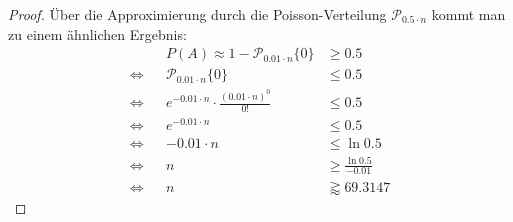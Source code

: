 \documentclass[a4paper]{scrartcl}
\newcommand{\gdw}{\Leftrightarrow}
\begin{document}
\begin{enumerate}[label=\bfseries\arabic*.]
\begin{enumerate}
\begin{proof}
                    Über die Approximierung durch die Poisson-Verteilung
                    $\mathcal{P}_{\num{0,5} \cdot n}$ kommt man zu einem
                    ähnlichen Ergebnis:
                    \begin{equation*}
                        \begin{aligned}
                            && P(A) \approx
                                    1 - \mathcal{P}_{\num{0.01} \cdot n}\{0\}
                                    &\geq \num{0,5} \\
                            \gdw && \mathcal{P}_{\num{0.01} \cdot n}\{0\}
                                    &\leq \num{0,5} \\
                            \gdw && e^{\num{-0.01} \cdot n} \cdot
                                    \frac{(\num{0,01} \cdot n)^0}{0!}
                                    &\leq \num{0,5} \\
                            \gdw && e^{\num{-0.01} \cdot n} &\leq \num{0,5} \\
                            \gdw && \num{-0.01} \cdot n &\leq \ln \num{0,5} \\
                            \gdw && n &\geq \frac{\ln \num{0,5}}{\num{-0,01}}
                                    \\
                            \gdw && n &\gtrapprox \num{69.3147}
                        \end{aligned}
                    \end{equation*}
                \end{proof}

        \end{enumerate}

\end{enumerate}
\end{document}
